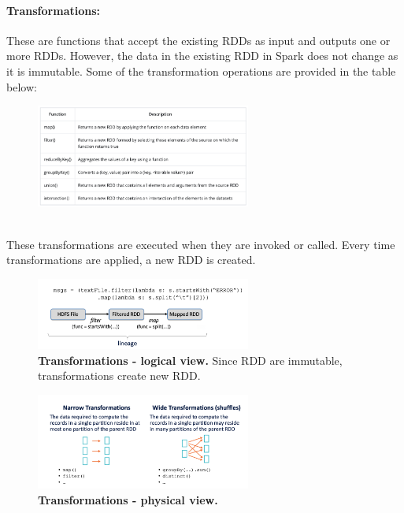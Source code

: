 \documentclass[10pt,a4paper]{article}
\begin{document}
 \paragraph{Transformations:} These are functions that accept the existing RDDs as input and outputs one or more RDDs. However, the data in the existing RDD in Spark does not change as it is immutable. Some of the transformation operations are provided in the table below:
   \begin{figure}[ht!]
 \hfill \includegraphics[width=200pt]{images/spark-rdd-transformation}
 \hspace*{\fill}
 \end{figure} \\
 These transformations are executed when they are invoked or called. Every time transformations are applied, a new RDD is created.
     \begin{figure}[ht!]
 \hfill \includegraphics[width=200pt]{images/spark-rdd-transformation-ex}
 \hspace*{\fill}
 \caption{\textbf{Transformations - logical view.} Since RDD are immutable, transformations create new RDD.}
 \end{figure} 
      \begin{figure}[ht!]
 \hfill \includegraphics[width=200pt]{images/spark-rdd-transformation-physical}
 \hspace*{\fill}
 \caption{\textbf{Transformations - physical view.}}
 \end{figure} 
\end{document}
